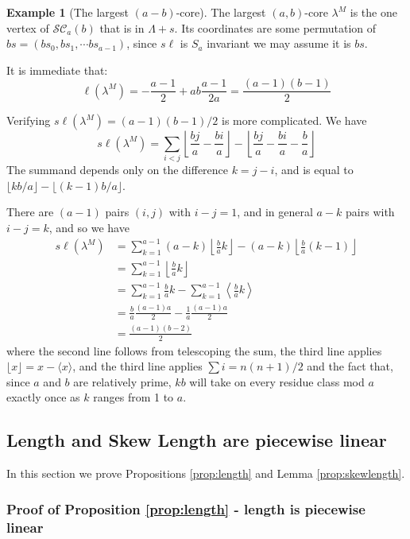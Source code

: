 \documentclass{amsart}[12pt]
\theoremstyle{definition}
\newtheorem{example}[dummy]{Example}
\newcommand{\SC}{\mathcal{SC}}
\newcommand{\sk}{s\ell}
\begin{document}
\begin{example}[The largest $(a-b)$-core]

The largest $(a,b)$-core $\lambda^M$ is the one vertex of $\SC_a(b)$ that is in $\Lambda+s$.  Its coordinates are some permutation of
$bs=(bs_0,bs_1,\cdots bs_{a-1})$, since $\sk$ is $S_a$ invariant we may assume it is $bs$.  

It is immediate that:
$$\ell(\lambda^M)=-\frac{a-1}{2}+ab\frac{a-1}{2a}=\frac{(a-1)(b-1)}{2}$$

Verifying $\sk(\lambda^M)=(a-1)(b-1)/2$ is more complicated.  We have 
$$\sk(\lambda^M)=\sum_{i<j} \left\lfloor \frac{bj}{a}-\frac{bi}{a}\right\rfloor
-\left\lfloor \frac{bj}{a}-\frac{bi}{a}-\frac{b}{a}\right\rfloor$$
The summand depends only on the difference $k=j-i$, and is equal to $\lfloor kb/a\rfloor-\lfloor(k-1)b/a\rfloor$.

There are $(a-1)$ pairs $(i,j)$ with $i-j=1$, and in general $a-k$ pairs with $i-j=k$, and so we have
\begin{align*}
\sk(\lambda^M) &=\sum_{k=1}^{a-1}(a-k)\left\lfloor \frac{b}{a} k\right\rfloor-(a-k)\left\lfloor\frac{b}{a}(k-1)\right\rfloor \\
&=\sum_{k=1}^{a-1} \left\lfloor \frac{b}{a} k\right\rfloor \\
&=\sum_{k=1}^{a-1} \frac{b}{a}k-\sum_{k=1}^{a-1}\left\langle \frac{b}{a}k\right\rangle \\
&=\frac{b}{a} \frac{(a-1)a}{2}-\frac{1}{a}\frac{(a-1)a}{2} \\
&=\frac{(a-1)(b-2)}{2}
\end{align*}
where the second line follows from telescoping the sum, the third line applies $\lfloor x\rfloor=x-\langle x\rangle$, and the third line applies $\sum i=n(n+1)/2$ and the fact that, since $a$ and $b$ are relatively prime, $kb$ will take on every residue class mod $a$ exactly once as $k$ ranges from 1 to $a$.

\end{example}


\subsection{Length and Skew Length are piecewise linear}
In this section we prove Propositions \ref{prop:length} and Lemma \ref{prop:skewlength}.

\subsubsection{Proof of Proposition \ref{prop:length} - length is piecewise linear} 
\end{document}

